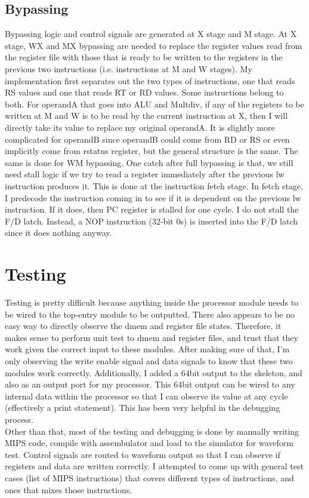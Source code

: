 \documentclass{article}
\begin{document}
		\subsection{Bypassing}
		Bypassing logic and control signals are generated at X stage and M stage. At X stage, WX and MX bypassing are needed to replace the register values read from the register file with those that is ready to be written to the registers in the previous two instructions (i.e. instructions at M and W stages). My implementation first separates out the two types of instructions, one that reads RS values and one that reads RT or RD values. Some instructions belong to both. For operandA that goes into ALU and Multdiv, if any of the registers to be written at M and W is to be read by the current instruction at X, then I will directly take its value to replace my original operandA. It is slightly more complicated for operandB since operandB could come from RD or RS or even implicitly come from rstatus register, but the general structure is the same. The same is done for WM bypassing. One catch after full bypassing is that, we still need stall logic if we try to read a register immediately after the previous lw instruction produces it. This is done at the instruction fetch stage. In fetch stage, I predecode the instruction coming in to see if it is dependent on the previous lw instruction. If it does, then PC register is stalled for one cycle. I do not stall the F/D latch. Instead, a NOP instruction (32-bit 0s) is inserted into the F/D latch since it does nothing anyway. 
	\section{Testing}
	Testing is pretty difficult because anything inside the processor module needs to be wired to the top-entry module to be outputted. There also appears to be no easy way to directly observe the dmem and register file states. Therefore, it makes sense to perform unit test to dmem and register files, and trust that they work given the correct input to these modules. After making sure of that, I'm only observing the write enable signal and data signals to know that these two modules work correctly. Additionally, I added a 64bit output to the skeleton, and also as an output port for my processor. This 64bit output can be wired to any internal data within the processor so that I can observe its value at any cycle (effectively a print statement). This has been very helpful in the debugging process. \\
	Other than that, most of the testing and debugging is done by manually writing MIPS code, compile with assembulator and load to the simulator for waveform test. Control signals are routed to waveform output so that I can observe if registers and data are written correctly. I attempted to come up with general test cases (list of MIPS instructions) that covers different types of instructions, and ones that mixes those instructions. 
\end{document}
